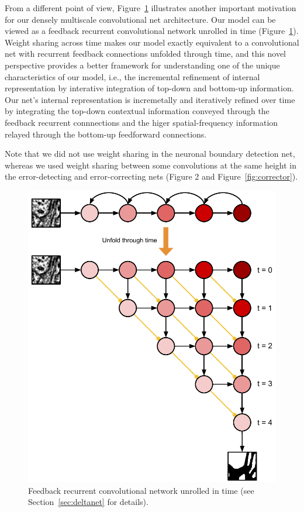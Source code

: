 From a different point of view, Figure~\ref{fig:unfold} illustrates another
important motivation for our densely multiscale convolutional net architecture.
Our model can be viewed as a feedback recurrent convolutional network unrolled
in time (Figure~\ref{fig:unfold}). Weight sharing across time makes our model
exactly equivalent to a convolutional net with recurrent feedback connections
unfolded through time, and this novel perspective provides a better framework
for understanding one of the unique characteristics of our model, i.e., the
incremental refinement of internal representation by interative integration of
top-down and bottom-up information. Our net's internal representation is
incremetally and iteratively refined over time by integrating the top-down
contextual information conveyed through the feedback recurrent connnections and
the higer spatial-frequency information relayed through the bottom-up
feedforward connections.

Note that we did not use weight sharing in the neuronal boundary detection net,
whereas we used weight sharing between some convolutions at the same height
in the error-detecting and error-correcting nets (Figure 2 and
Figure~\ref{fig:corrector}).

\begin{figure}[!t]
\centering
\includegraphics[width=0.65\linewidth]{unfold.pdf}

\caption{Feedback recurrent convolutional network unrolled in time
(see Section~\ref{sec:deltanet} for details).}

\label{fig:unfold}
\end{figure}

